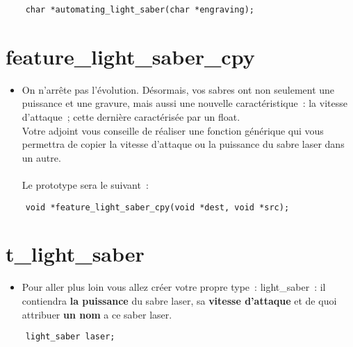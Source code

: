 \documentclass{koala-en}
\begin{document}
\begin{lstlisting}
	char *automating_light_saber(char *engraving);
\end{lstlisting}
\newpage

\chapter{feature\_light\_saber\_cpy}

\begin{itemize}
	\item	On n'arrête pas l'évolution. Désormais, vos sabres ont non seulement une puissance et une gravure, mais aussi une nouvelle caractéristique~: la vitesse d'attaque~;
		cette dernière caractérisée par un float.\\
		Votre adjoint vous conseille de réaliser une fonction générique qui vous permettra de copier la vitesse d'attaque ou la puissance du sabre laser dans un autre.\\\\
		Le prototype sera le suivant~:
\end{itemize}

\begin{lstlisting}
	void *feature_light_saber_cpy(void *dest, void *src);
\end{lstlisting}


\newpage

\chapter{t\_light\_saber}


\begin{itemize}
	\item	Pour aller plus loin vous allez créer votre propre type~: light\_saber~:
		il contiendra \textbf{la puissance} du sabre laser, sa \textbf{vitesse d'attaque} et de quoi attribuer \textbf{un nom} a ce saber laser.
\end{itemize}

\begin{lstlisting}
	light_saber laser;
\end{lstlisting}
\end{document}
